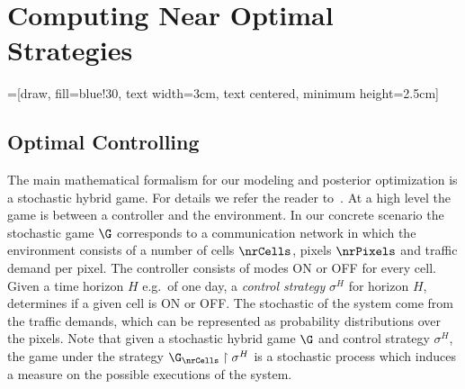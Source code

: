 \section{Computing Near Optimal Strategies}

=[draw, fill=blue!30, text width=3cm, 
text centered, minimum height=2.5cm]


\subsection{Optimal Controlling}

The main mathematical formalism for our modeling and posterior
optimization is a stochastic hybrid game. For details we refer the
reader to~\cite{DBLP:conf/tacas/LarsenMMST16}.
%
At a high level the game is between a controller and the environment.
In our concrete scenario the stochastic game $\G$ corresponds to a
communication network in which the environment consists of a number of
cells $\nrCells$, pixels $\nrPixels$ and traffic demand per pixel. The
controller consists of modes \textsf{ON} or \textsf{OFF} for every
cell. Given a time horizon $H$ e.g.\ of one day, a \emph{control
  strategy} $\sigma^H$ for horizon $H$, determines if a given cell is
\textsf{ON} or \textsf{OFF}. The stochastic of the system come from
the traffic demands, which can be represented as probability
distributions over the pixels. Note that given a stochastic hybrid
game $\G$ and control strategy $\sigma^H$, the game under the
strategy $\G_{\nrCells} \upharpoonright\sigma^H$ is a stochastic
process which induces a measure on the possible executions of the
system.


